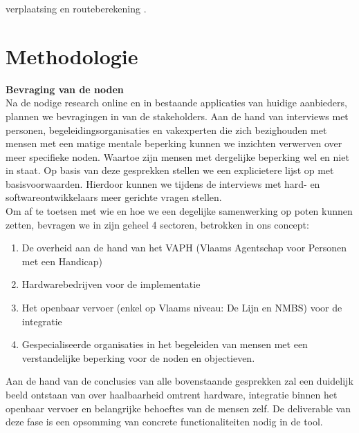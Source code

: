 \documentclass{hogent-article}
\begin{document}
verplaatsing en routeberekening \autocite{Fatnassi2015}.
    
    \section{Methodologie}%
    \label{sec:methodologie}
    
    
    \textbf{Bevraging van de noden} \\
    Na de nodige research online en in bestaande applicaties van huidige aanbieders, plannen we bevragingen in van de stakeholders. Aan de hand van interviews met personen, begeleidingsorganisaties en vakexperten die zich bezighouden met mensen met een matige mentale beperking kunnen we inzichten verwerven over meer specifieke noden. Waartoe zijn mensen met dergelijke beperking wel en niet in staat. Op basis van deze gesprekken stellen we een explicietere lijst op met basisvoorwaarden. Hierdoor kunnen we tijdens de interviews met hard- en softwareontwikkelaars meer gerichte vragen stellen. \\
    Om af te toetsen met wie en hoe we een degelijke samenwerking op poten kunnen zetten, bevragen we in zijn geheel 4 sectoren, betrokken in ons concept:
    \begin{enumerate}
        \item De overheid aan de hand van het VAPH (Vlaams Agentschap voor Personen met een Handicap)
        \item Hardwarebedrijven voor de implementatie
        \item Het openbaar vervoer (enkel op Vlaams niveau: De Lijn en NMBS) voor de integratie
        \item Gespecialiseerde organisaties in het begeleiden van mensen met een verstandelijke beperking voor de noden en objectieven.
    \end{enumerate}
    Aan de hand van de conclusies van alle bovenstaande gesprekken zal een duidelijk beeld ontstaan van over haalbaarheid omtrent hardware, integratie binnen het openbaar vervoer en belangrijke behoeftes van de mensen zelf.
    De deliverable van deze fase is een opsomming van concrete functionaliteiten nodig in de tool. \\\\
    
\end{document}
